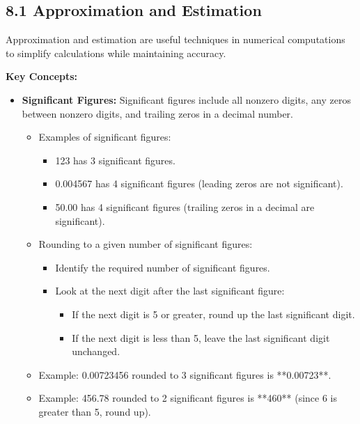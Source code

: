 
\subsection*{8.1 Approximation and Estimation}
Approximation and estimation are useful techniques in numerical computations to simplify calculations while maintaining accuracy.

\textbf{Key Concepts:}
\begin{itemize}
	\item \textbf{Significant Figures:} Significant figures include all nonzero digits, any zeros between nonzero digits, and trailing zeros in a decimal number.
	
	\begin{itemize}
		\item Examples of significant figures:
		\begin{itemize}
			\item 123 has 3 significant figures.
			\item 0.004567 has 4 significant figures (leading zeros are not significant).
			\item 50.00 has 4 significant figures (trailing zeros in a decimal are significant).
		\end{itemize}
		
		\item Rounding to a given number of significant figures:
		\begin{itemize}
			\item Identify the required number of significant figures.
			\item Look at the next digit after the last significant figure:
			\begin{itemize}
				\item If the next digit is 5 or greater, round up the last significant digit.
				\item If the next digit is less than 5, leave the last significant digit unchanged.
			\end{itemize}
		\end{itemize}
		
		\item Example: 0.00723456 rounded to 3 significant figures is **0.00723**.
		\item Example: 456.78 rounded to 2 significant figures is **460** (since 6 is greater than 5, round up).
		

\end{itemize}
\end{itemize}
